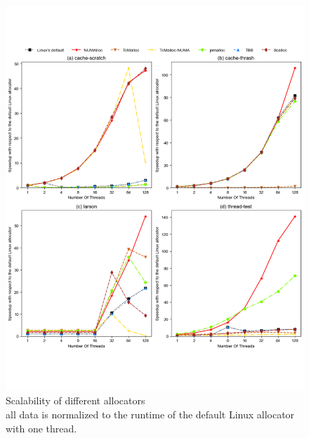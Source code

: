  
\begin{figure}[!th]
    \centering
    \includegraphics[width=\textwidth]{figure/sythentic-scalobility.pdf}
    \caption{Scalability of different allocators\\ all data is normalized to the runtime of the default Linux allocator with one thread.}
    \label{sythentic-scalability}
\end{figure}

